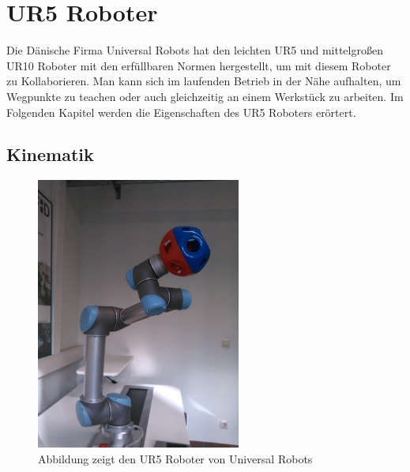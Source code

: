 \section{UR5 Roboter}
\label{sec:ur_robot_gru}

Die Dänische Firma Universal Robots hat den leichten UR5 und mittelgroßen UR10 Roboter mit den erfüllbaren Normen hergestellt, um mit diesem Roboter zu Kollaborieren. Man kann sich im laufenden Betrieb in der Nähe aufhalten, um Wegpunkte zu \ac{teachen} oder auch gleichzeitig an einem Werkstück zu arbeiten.
Im Folgenden Kapitel werden die Eigenschaften des UR5 Roboters erörtert.

\subsection{Kinematik}
\label{ur_eigenschaften_gru}

\begin{figure}[H]
  \centering
    \includegraphics[width=0.6\textwidth]{pic/ur5_robot.jpg}
      \caption[UR5 Roboter]{Abbildung zeigt den UR5 Roboter von Universal Robots}
      \label{fig:schnittstellen_schichten}
\end{figure}

